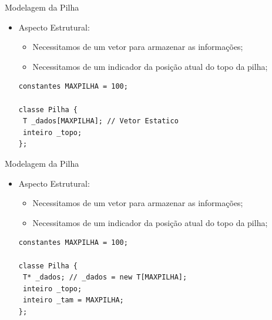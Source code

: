 \documentclass[12pt,table,xcolor={dvipsnames}]{beamer}
\begin{document}
\begin{frame}[fragile]{Modelagem da Pilha}

\begin{itemize}
\item Aspecto Estrutural:
\begin{itemize}
\item Necessitamos de um vetor para armazenar as informações;
\item Necessitamos de um indicador da posição atual do topo da pilha;
\end{itemize}
\begin{lstlisting}
constantes MAXPILHA = 100;

classe Pilha {
 T _dados[MAXPILHA]; // Vetor Estatico
 inteiro _topo;        
};
\end{lstlisting}
\end{itemize}
\end{frame}

\begin{frame}[fragile]{Modelagem da Pilha}

\begin{itemize}
\item Aspecto Estrutural:
\begin{itemize}
\item Necessitamos de um vetor para armazenar as informações;
\item Necessitamos de um indicador da posição atual do topo da pilha;
\end{itemize}
\begin{lstlisting}
constantes MAXPILHA = 100;

classe Pilha {
 T* _dados; // _dados = new T[MAXPILHA];
 inteiro _topo;
 inteiro _tam = MAXPILHA;
};
\end{lstlisting}
\end{itemize}
\end{frame}
\end{document}
